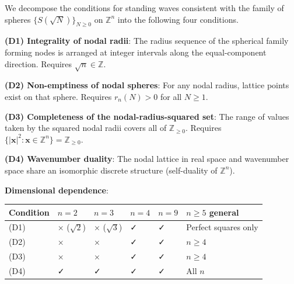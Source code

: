 \documentclass[
  a4paper,11pt]{article}
\newcounter{none}
\theoremstyle{definition}
\theoremstyle{remark}
\begin{document}
We decompose the conditions for standing waves consistent with the
family of spheres \(\{S(\sqrt{N})\}_{N \geq 0}\) on \(\mathbb{Z}^n\)
into the following four conditions.

\textbf{(D1) Integrality of nodal radii}: The radius sequence of the
spherical family forming nodes is arranged at integer intervals along
the equal-component direction. Requires \(\sqrt{n} \in \mathbb{Z}\).

\textbf{(D2) Non-emptiness of nodal spheres}: For any nodal radius,
lattice points exist on that sphere. Requires \(r_n(N) > 0\) for all
\(N \geq 1\).

\textbf{(D3) Completeness of the nodal-radius-squared set}: The range of
values taken by the squared nodal radii covers all of
\(\mathbb{Z}_{\geq 0}\). Requires
\(\{|\mathbf{x}|^2 : \mathbf{x} \in \mathbb{Z}^n\} = \mathbb{Z}_{\geq 0}\).

\textbf{(D4) Wavenumber duality}: The nodal lattice in real space and
wavenumber space share an isomorphic discrete structure (self-duality of
\(\mathbb{Z}^n\)).

\textbf{Dimensional dependence}:

{\def\LTcaptype{none} %
\begin{longtable}[]{@{}
  >{\raggedright\arraybackslash}p{}
  >{\raggedright\arraybackslash}p{}
  >{\raggedright\arraybackslash}p{}
  >{\raggedright\arraybackslash}p{}
  >{\raggedright\arraybackslash}p{}
  >{\raggedright\arraybackslash}p{}@{}}
\toprule\noalign{}
\begin{minipage}[b]{\linewidth}\raggedright
Condition
\end{minipage} & \begin{minipage}[b]{\linewidth}\raggedright
\(n=2\)
\end{minipage} & \begin{minipage}[b]{\linewidth}\raggedright
\(n=3\)
\end{minipage} & \begin{minipage}[b]{\linewidth}\raggedright
\(n=4\)
\end{minipage} & \begin{minipage}[b]{\linewidth}\raggedright
\(n=9\)
\end{minipage} & \begin{minipage}[b]{\linewidth}\raggedright
\(n \geq 5\) general
\end{minipage} \\
\midrule\noalign{}
\endhead
\bottomrule\noalign{}
\endlastfoot
(D1) & × (\(\sqrt{2}\)) & × (\(\sqrt{3}\)) & ✓ & ✓ & Perfect squares
only \\
(D2) & × & × & ✓ & ✓ & \(n \geq 4\) \\
(D3) & × & × & ✓ & ✓ & \(n \geq 4\) \\
(D4) & ✓ & ✓ & ✓ & ✓ & All \(n\) \\
\end{longtable}
}
\end{document}
